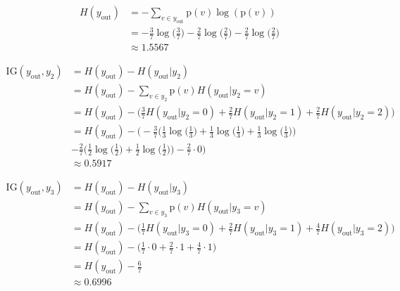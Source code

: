 \documentclass[12pt]{article}
\newcommand{\info}[2]{\frac{#1}{#2}\log\bigl( \frac{#1}{#2} \bigr)}
\begin{document}
\begin{enumerate}[leftmargin=\labelsep]
\begin{equation}
    \begin{split}
        H(y_\textrm{out}) & = -\sum_{v \in y_\textrm{out}}\textrm{p}(v)\log(\textrm{p}(v)) \\
        & = -\info{3}{7} - \info{2}{7} - \info{2}{7} \\
        & \approx 1.5567
    \end{split}
\end{equation}

\begin{equation}
    \begin{split}
        \textrm{IG}(y_\textrm{out}, y_2) &= H(y_\textrm{out}) - H(y_\textrm{out}|y_2) \\
        & = H(y_\textrm{out}) - \sum_{v \in y_2}\textrm{p}(v)H(y_\textrm{out}|y_2=v) \\
        & = H(y_\textrm{out}) - \Biggl( \frac{3}{7}H(y_\textrm{out}|y_2=0) + \frac{2}{7}H(y_\textrm{out}|y_2=1) + \frac{2}{7}H(y_\textrm{out}|y_2=2)\Biggr) \\
        & = H(y_\textrm{out}) - \Biggl( -\frac{3}{7}\biggl( \info{1}{3} + \info{1}{3} + \info{1}{3} \biggr) \\
        & - \frac{2}{7}\biggl( \info{1}{2} + \info{1}{2} \biggr) - \frac{2}{7} \cdot 0 \Biggr) \\
        & \approx 0.5917
    \end{split}
\end{equation}

\begin{equation}
    \begin{split}
        \textrm{IG}(y_\textrm{out}, y_3) &= H(y_\textrm{out}) - H(y_\textrm{out}|y_3) \\
        & = H(y_\textrm{out}) - \sum_{v \in y_3}\textrm{p}(v)H(y_\textrm{out}|y_3=v) \\
        & = H(y_\textrm{out}) - \Biggl( \frac{1}{7}H(y_\textrm{out}|y_3=0) + \frac{2}{7}H(y_\textrm{out}|y_3=1) + \frac{4}{7}H(y_\textrm{out}|y_3=2)\Biggr) \\
        & = H(y_\textrm{out}) - \Biggl( \frac{1}{7} \cdot 0 + \frac{2}{7} \cdot 1 + \frac{4}{7} \cdot 1  \Biggr) \\
        & = H(y_\textrm{out}) - \frac{6}{7} \\
        & \approx 0.6996
    \end{split}
\end{equation}


\end{enumerate}
\end{document}
